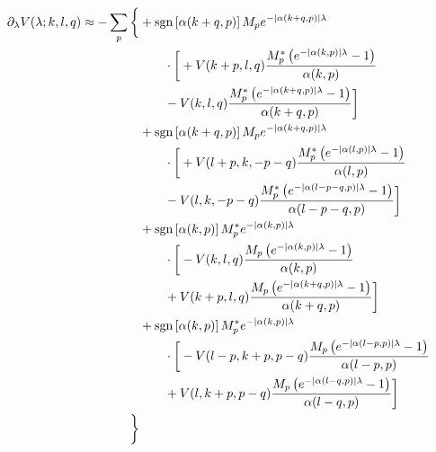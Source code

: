 \begin{align*}
	\partial_{\lambda} V(\lambda; k, l, q) \approx - \sum_{p} \bigg\{ &+\operatorname{sgn} \left[\alpha (k+q, p)\right] M_{p} e^{ - | \alpha (k+q,p) | \lambda }\\
		&\qquad\cdot\bigg[  + V(k+p, l, q) \frac{M_{p}^* \left(  e^{ - | \alpha (k,p) | \lambda } - 1 \right)}{\alpha (k, p)}\\
		&\qquad - V(k, l, q) \frac{M_{p}^* \left(  e^{ - | \alpha (k+q,p) | \lambda } - 1 \right)}{\alpha (k+q, p)} \bigg]\\
	&+\operatorname{sgn} \left[\alpha (k+q, p)\right] M_{p} e^{ - | \alpha (k+q,p) | \lambda }\\
		&\qquad\cdot\bigg[  + V(l+p, k, -p-q) \frac{M_{p}^* \left(  e^{ - | \alpha (l,p) | \lambda } - 1 \right)}{\alpha (l, p)}\\
		&\qquad - V(l, k, -p-q) \frac{M_{p}^* \left(  e^{ - | \alpha (l-p-q,p) | \lambda } - 1 \right)}{\alpha (l-p-q, p)} \bigg]\\
	&+\operatorname{sgn} \left[ \alpha (k, p) \right] M_{p}^* e^{ - | \alpha (k,p) | \lambda }\\
		&\qquad\cdot\bigg[  - V(k, l, q) \frac{M_{p} \left(  e^{ - | \alpha (k,p) | \lambda } - 1 \right) }{\alpha (k, p)}\\
		&\qquad + V(k+p, l, q) \frac{M_{p} \left(  e^{ - | \alpha (k+q,p) | \lambda } - 1 \right)}{\alpha (k+q, p)} \bigg]\\
	&+\operatorname{sgn} \left[ \alpha (k, p) \right] M_{p}^* e^{ - | \alpha (k,p) | \lambda }\\
		&\qquad\cdot\bigg[  - V(l-p, k+p, p-q) \frac{M_{p} \left(  e^{ - | \alpha (l-p,p) | \lambda } - 1 \right) }{\alpha (l-p, p)}\\
		&\qquad + V(l, k+p, p-q) \frac{M_{p} \left(  e^{ - | \alpha (l-q,p) | \lambda } - 1 \right)}{\alpha (l-q, p)} \bigg]\\
	 \bigg\}
\end{align*}
